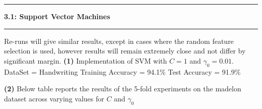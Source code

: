 \documentclass{article}
\newcommand\question[2]{\vspace{.25in}\hrule\textbf{#1: #2}\hrule\vspace{.10in}}
\renewcommand\part[1]{\vspace{.10in}\textbf{(#1)}}
\begin{document}
   \question{3.1}{Support Vector Machines}
   Re-runs will give similar results, except in cases where the random feature selection is used, however results will remain extremely close and not differ by significant margin. \newline
   \part{1} Implementation of SVM with $C=1$ and $\gamma_0 = 0.01$. \newline
   DataSet = Handwriting \newline
   Training Accuracy = 94.1\% \newline
   Test Accuracy = 91.9\% \newline

   \part{2} Below table reports the results of the 5-fold experiments on the madelon dataset across varying values for $C$ and $\gamma_0$
  
\end{document}

